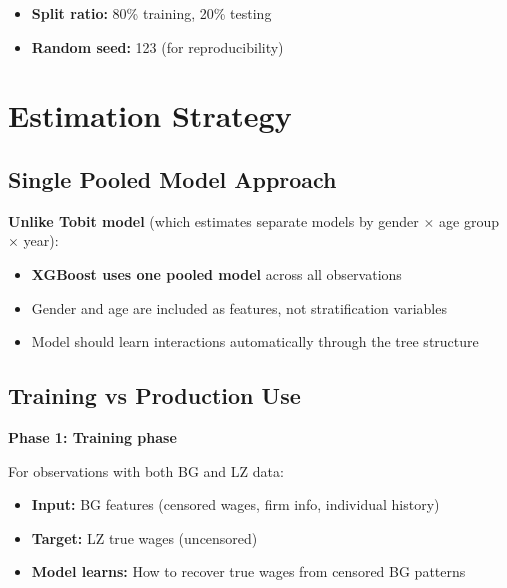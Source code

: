 \documentclass{article}
\begin{document}
\begin{itemize}
    \item \textbf{Split ratio:} 80\% training, 20\% testing
    \item \textbf{Random seed:} 123 (for reproducibility)
\end{itemize}

\section{Estimation Strategy}

\subsection{Single Pooled Model Approach}

\textbf{Unlike Tobit model} (which estimates separate models by gender $\times$ age group $\times$ year):
\begin{itemize}
    \item \textbf{XGBoost uses one pooled model} across all observations
    \item Gender and age are included as features, not stratification variables
    \item Model should learn interactions automatically through the tree structure
\end{itemize}

\subsection{Training vs Production Use}

\textbf{Phase 1: Training phase}

For observations with both BG and LZ data:
\begin{itemize}
    \item \textbf{Input:} BG features (censored wages, firm info, individual history)
    \item \textbf{Target:} LZ true wages (uncensored)
    \item \textbf{Model learns:} How to recover true wages from censored BG patterns
\end{itemize}
\end{document}

